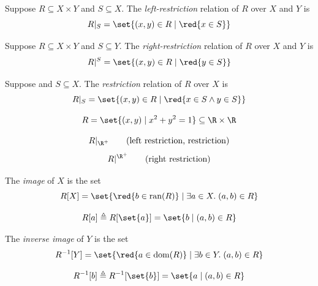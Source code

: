 \begin{frame}{}
  \begin{definition}
    Suppose $R \subseteq X \times Y$ and $S \subseteq X$.
    The {\it left-restriction} relation of $R$  over $X$ and $Y$ is
    \[
      R|_{S} = \set{(x, y) \in R \mid \red{x \in S}}
    \]
  \end{definition}

  \pause
  \vspace{0.50cm}
  \begin{definition}
    Suppose $R \subseteq X \times Y$ and $S \subseteq Y$.
    The {\it right-restriction} relation of $R$  over $X$ and $Y$ is
    \[
      R|^{S} = \set{(x, y) \in R \mid \red{y \in S}}
    \]
  \end{definition}

  \pause
  \vspace{0.50cm}
  \begin{definition}[限制 (Restriction)]
    Suppose  and $S \subseteq X$.
    The {\it restriction} relation of $R$  over $X$ is
    \[
      R|_{S} = \set{(x, y) \in R \mid \red{x \in S \land y \in S}}
    \]
  \end{definition}
\end{frame}

\begin{frame}{}
  \[
    R = \set{(x, y) \mid x^2 + y^2 = 1} \subseteq \R \times \R
  \]

  \pause
  \[
    R|_{\R^{+}} \qquad (\text{left restriction, restriction})
  \]
  \pause
  \[
    R|^{\R^{+}} \qquad (\text{right restriction})
  \]
\end{frame}

\begin{frame}{}
  \begin{definition}[像 (Image)]
    The {\it image} of $X$  is the set
    \[
      R[X] = \set{\red{b \in \text{ran}(R)} \mid \exists a \in X.\; (a, b) \in R}
    \]
  \end{definition}

  \pause
  \[
    R[a] \triangleq R[\set{a}] = \set{b \mid (a, b) \in R}
  \]
\end{frame}

\begin{frame}{}
  \begin{definition}
    The {\it inverse image} of $Y$  is the set
    \[
      R^{-1}[Y] = \set{\red{a \in \text{dom}(R)} \mid \exists b \in Y.\; (a, b) \in R}
    \]
  \end{definition}

  \pause
  \[
    R^{-1}[b] \triangleq R^{-1}[\set{b}] = \set{a \mid (a, b) \in R}
  \]
\end{frame}

